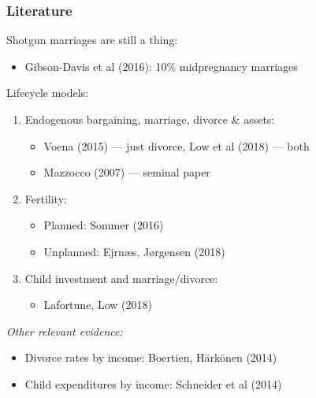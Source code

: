 \documentclass{beamer}
\begin{document}
\begin{frame}
\frametitle{Literature}
Shotgun marriages are still a thing:
\begin{itemize}
\item Gibson-Davis et al (2016): 10\% midpregnancy marriages
\end{itemize}
Lifecycle models:
\begin{enumerate}
\item Endogenous bargaining, marriage, divorce \& assets:
\begin{itemize}
\item Voena (2015) --- just divorce, Low et al (2018) --- both
\item Mazzocco (2007) --- seminal paper
\end{itemize}
\item Fertility:
\begin{itemize}
\item Planned: Sommer (2016)
\item Unplanned: Ejrnæs, Jørgensen (2018)
\end{itemize}
\item Child investment and marriage/divorce:
\begin{itemize}
\item Lafortune, Low (2018)
\end{itemize}
\end{enumerate}

\textit{Other relevant evidence:}
\begin{itemize}
\item Divorce rates by income: Boertien, Härkönen (2014)
\item Child expenditures by income: Schneider et al (2014)
\end{itemize}

\end{frame}
\end{document}
